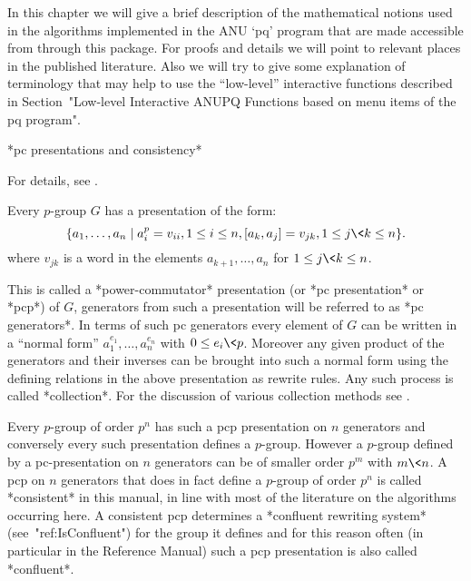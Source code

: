 

In this chapter  we will give a brief  description of the mathematical
notions used in the algorithms  implemented in the ANU `pq' program
that are made accessible from {\GAP} through this package.  For proofs
and  details  we  will  point  to relevant  places  in  the  published
literature.  Also we will try  to give some explanation of terminology
that may help to use the ``low-level'' interactive functions described
in Section~"Low-level Interactive ANUPQ  Functions based on menu items
of the pq program".


*pc presentations and consistency*

For details, see \cite{NNN98}.

Every $p$-group $G$ has a presentation of the form: 
$$
\{a_1,\dots,a_n \mid a_i^p = v_{ii}, 1 \le i \le n, 
               [a_k, a_j] = v_{jk}, 1 \le j \< k \le n \}.  
$$
where $v_{jk}$ is a word in the elements $a_{k+1},\dots,a_n$ for 
$1 \le j \< k \le n$.

This is  called a *power-commutator*  presentation (or *pc presentation*
or *pcp*) of $G$, generators from  such a presentation will be referred
to as *pc generators*.  In terms of such pc generators every element
of $G$  can be written in a  ``normal form'' $a_1^{e_1},\dots,a_n^{e_n}$
with $0 \le  e_i \< p$.  Moreover any given  product of the generators
and  their inverses can  be brought  into such a  normal form  using the
defining  relations in the  above presentation  as rewrite  rules. Any
such process is called  *collection*.  For the discussion of various
collection methods see \cite{LGS90}.

Every  $p$-group of order  $p^n$ has  such a  pcp presentation  on $n$
generators and conversely every such presentation defines a $p$-group.
However a $p$-group defined by a pc-presentation on $n$ generators can
be of  smaller order $p^m$ with  $m\<n$. A pcp on  $n$ generators that
does  in   fact  define   a  $p$-group  of   order  $p^n$   is  called
*consistent* in this  manual, in line with most  of the literature on
the  algorithms  occurring  here.  A  consistent  pcp   determines   a
*confluent rewriting system* (see~"ref:IsConfluent") for the group  it
defines and for  this  reason  often  (in  particular  in  the  {\GAP}
Reference  Manual)  such   a   pcp   presentation   is   also   called
*confluent*.

